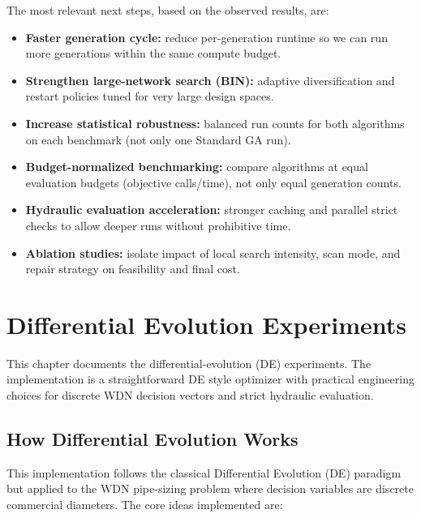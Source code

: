 \documentclass[12pt, a4paper]{article}
\begin{document}
The most relevant next steps, based on the observed results, are:
\begin{itemize}
	\item \textbf{Faster generation cycle:} reduce per-generation runtime so we can run more generations within the same compute budget.
	\item \textbf{Strengthen large-network search (BIN):} adaptive diversification and restart policies tuned for very large design spaces.
	\item \textbf{Increase statistical robustness:} balanced run counts for both algorithms on each benchmark (not only one Standard GA run).
	\item \textbf{Budget-normalized benchmarking:} compare algorithms at equal evaluation budgets (objective calls/time), not only equal generation counts.
	\item \textbf{Hydraulic evaluation acceleration:} stronger caching and parallel strict checks to allow deeper runs without prohibitive time.
	\item \textbf{Ablation studies:} isolate impact of local search intensity, scan mode, and repair strategy on feasibility and final cost.
\end{itemize}

\section{Differential Evolution Experiments}

This chapter documents the differential-evolution (DE) experiments. The implementation is a straightforward DE style optimizer with practical engineering choices for discrete WDN decision vectors and strict hydraulic evaluation.

\subsection{How Differential Evolution Works}

This implementation follows the classical Differential Evolution (DE) paradigm but applied to the WDN pipe-sizing problem where decision variables are discrete commercial diameters. The core ideas implemented are:
\end{document}
